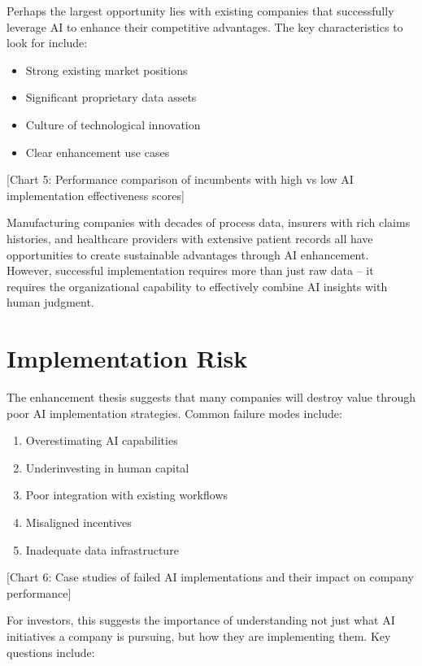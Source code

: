 \documentclass[
  Letterpaper,
]{scrbook}
\providecommand{\tightlist}{%
  \setlength{\itemsep}{0pt}\setlength{\parskip}{0pt}}\usepackage{longtable,booktabs,array}
\begin{document}
Perhaps the largest opportunity lies with existing companies that
successfully leverage AI to enhance their competitive advantages. The
key characteristics to look for include:

\begin{itemize}
\tightlist
\item
  Strong existing market positions
\item
  Significant proprietary data assets
\item
  Culture of technological innovation
\item
  Clear enhancement use cases
\end{itemize}

{[}Chart 5: Performance comparison of incumbents with high vs low AI
implementation effectiveness scores{]}

Manufacturing companies with decades of process data, insurers with rich
claims histories, and healthcare providers with extensive patient
records all have opportunities to create sustainable advantages through
AI enhancement. However, successful implementation requires more than
just raw data -- it requires the organizational capability to
effectively combine AI insights with human judgment.

\section{Implementation Risk}\label{implementation-risk}

The enhancement thesis suggests that many companies will destroy value
through poor AI implementation strategies. Common failure modes include:

\begin{enumerate}
\def\labelenumi{\arabic{enumi}.}
\tightlist
\item
  Overestimating AI capabilities
\item
  Underinvesting in human capital
\item
  Poor integration with existing workflows
\item
  Misaligned incentives
\item
  Inadequate data infrastructure
\end{enumerate}

{[}Chart 6: Case studies of failed AI implementations and their impact
on company performance{]}

For investors, this suggests the importance of understanding not just
what AI initiatives a company is pursuing, but how they are implementing
them. Key questions include:
\end{document}
